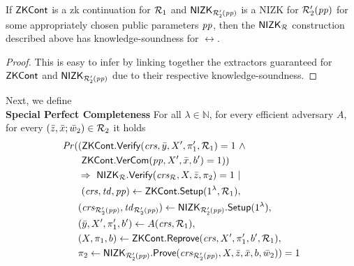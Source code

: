 \begin{lemma} 
\label{le:KS_for_nizkR}
If ${\mathsf{ZKCont}}$ is a zk continuation for $\mathcal{R}_1$ and ${\mathsf{NIZK_{\mathcal{R}'_2(\mathit{pp})}}}$ is a NIZK for $\mathcal{R}_2'(\mathit{pp})$ for some appropriately chosen public parameters $\mathit{pp}$, 
then the ${\mathsf{NIZK_{\mathcal{R}}}}$ construction described above has knowledge-soundness for $\rel$. 
\end{lemma} 
\begin{proof}This is easy to infer by linking together the extractors guaranteed for ${\mathsf{ZKCont}}$ and ${\mathsf{NIZK_{\mathcal{R}'_2(\mathit{pp})}}}$ due to their respective 
knowledge-soundness.
\end{proof}
 \noindent Next, we define \\ 
\noindent \textbf{Special Perfect Completeness} For all $\lambda \in \mathbb{N}$, for every efficient adversary $A$, for every 
 $(\bar{z}, \bar{x}; \bar{w}_2) \in \mathcal{R}_2$ it holds
\begin{align*}
\mathit{Pr} (& ({\mathsf{ZKCont}}.{\mathsf{Verify}}(\mathit{crs}, \bar{y}, X', \pi'_1, \mathcal{R}_1) = 1 \ \wedge \ \\
                   & \ {\mathsf{ZKCont}}.{\mathsf{VerCom}} (\mathit{pp}, X', \bar{x}, b') = 1) ) \\
                   & \Rightarrow \ {\mathsf{NIZK_{\mathcal{R}}}}.{\mathsf{Verify}}(\mathit{crs}_{\mathcal{R}}, X, \bar{z}, \pi_2) =1 \ | \  \\
                   & \ (\mathit{crs}, \mathit{td}, \mathit{pp}) \leftarrow {\ensuremath{\mathsf{ZKCont}}}.{\mathsf{Setup}} (1^{\lambda}, \mathcal{R}_1), \\
                   & (\mathit{crs}_{\mathcal{R}'_2(\mathit{pp})}, \mathit{td}_{\mathcal{R}'_2(\mathit{pp})}) \leftarrow {\ensuremath{\mathsf{NIZK_{\mathcal{R}'_2(\mathit{pp})}}}}.{\mathsf{Setup}}(1^{\lambda}), \\
                   & (\bar{y}, X', \pi'_1, b') \leftarrow A(\mathit{crs},\mathcal{R}_1), \\ 
                   & (X, \pi_1, b) \leftarrow {\ensuremath{\mathsf{ZKCont}}}.{\mathsf{Reprove}}(\mathit{crs}, X', \pi'_1, b', \mathcal{R}_1), \\
                   &\pi_2 \leftarrow {\ensuremath{\mathsf{NIZK_{\mathcal{R}'_2(\mathit{pp})}}}}.{\mathsf{Prove}}(\mathit{crs}_{\mathcal{R}'_2(\mathit{pp})}, X, \bar{z}, \bar{x}, b, \bar{w}_2)) = 1
\end{align*}

